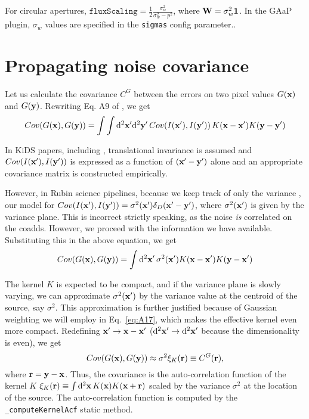 \documentclass[DM,lsstdraft, authoryear,toc]{lsstdoc}
\newcommand{\rmd}{\mathrm{d}^2}
\begin{document}
For circular apertures, $\texttt{fluxScaling} = \frac{1}{2}\frac{\sigma_w^2}{\sigma_w^2-p^2}$, 
where ${\bf W} = \sigma_w^2 \bf{1}$. In the GAaP plugin, $\sigma_w$ values are specified in the \texttt{sigmas} config parameter..

\section{Propagating noise covariance}
Let us calculate the covariance $C^G$ between the errors on two pixel values $G({\bf x})$ and $G({\bf y})$. Rewriting Eq. A9 of \cite{Kuijken2015}, we get
\begin{equation}
  Cov(G({\bf x}), G({\bf y})) = \int\int\rmd{\bf x}'\rmd{\bf y}'\, Cov(I({\bf x}'),I({\bf y}'))\, K({\bf x}-{\bf x}')K({\bf y}-{\bf y}')
\end{equation}

In KiDS papers, including \cite{Kuijken2015}, translational invariance is assumed and $Cov(I({\bf x}'),I({\bf y}'))$ is expressed as a function of $({\bf x}'-{\bf y}')$ alone and an appropriate covariance matrix is constructed empirically.

However, in Rubin science pipelines, because we keep track of only the variance , our model for $Cov(I({\bf x}'), I({\bf y}')) = \sigma^2({\bf x}')\delta_D({\bf x'}-{\bf y}')$, where $\sigma^2({\bf x}')$ is given by the variance plane. This is incorrect strictly speaking, as the noise \emph{is} correlated on the coadds. However, we proceed with the information we have available. Substituting this in the above equation, we get
\begin{equation}
  Cov(G({\bf x}), G({\bf y})) = \int\rmd{\bf x}'\, \sigma^2({\bf x}') K({\bf x}-{\bf x}')K({\bf y}-{\bf x}')
\end{equation}

The kernel $K$ is expected to be compact, and if the variance plane is slowly varying, we can approximate $\sigma^2({\bf x}')$ by the variance value at the centroid of the source, say $\sigma^2$. This approximation is further justified because of Gaussian weighting we will employ in Eq.~\ref{eq:A17}, which makes the effective kernel even more compact. Redefining ${\bf x}' \rightarrow {\bf x} - {\bf x}'$ ($\rmd{\bf x}' \rightarrow \rmd{\bf x}'$ because the dimensionality is even), we get
\begin{equation}
  Cov(G({\bf x}), G({\bf y})) \approx \sigma^2 \xi_K({\bf r}) \equiv C^G({\bf r}),
\end{equation}
where ${\bf r} = {\bf y}-{\bf x}$. Thus, the covariance is the auto-correlation function of the kernel $K$ $\xi_K({\bf r}) \equiv \int\rmd{\bf x}\, K({\bf x})K({\bf x}+{\bf r})$  scaled by the variance $\sigma^2$ at the location of the source. The auto-correlation function is computed by the \texttt{\_computeKernelAcf} static method.
\end{document}
